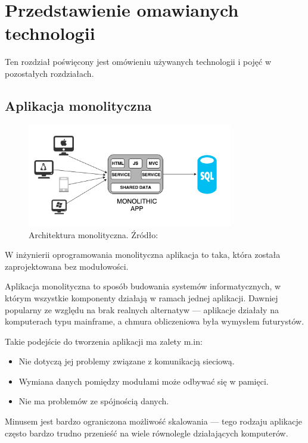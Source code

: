 \chapter{Przedstawienie omawianych technologii}
Ten rozdział poświęcony jest omówieniu używanych technologii i pojęć w pozostałych rozdziałach.
\section{Aplikacja monolityczna}

\begin{figure}[h!]
  \centering
    \includegraphics[width=0.8\textwidth]{images/monolithic-arch.png}
  \caption{Architektura monolityczna. Źródło: \cite{MonolitVsMicro} }
\end{figure}

W inżynierii oprogramowania monolityczna aplikacja to taka, która została zaprojektowana bez modułowości.\cite{Monolit2}

Aplikacja monolityczna to sposób budowania systemów informatycznych, w którym wszystkie komponenty działają w ramach jednej aplikacji. Dawniej popularny ze względu na brak realnych alternatyw — aplikacje działały na komputerach typu mainframe, a chmura obliczeniowa była wymysłem futurystów.

Takie podejście do tworzenia aplikacji ma zalety m.in:
\begin{itemize}
    \item Nie dotyczą jej problemy związane z komunikacją sieciową.
    \item Wymiana danych pomiędzy modułami może odbywać się w pamięci.
    \item Nie ma problemów ze spójnością danych.
\end{itemize}

Minusem jest bardzo ograniczona możliwość skalowania — tego rodzaju aplikacje często bardzo trudno przenieść na wiele równolegle działających komputerów.\cite{Monolit1}

